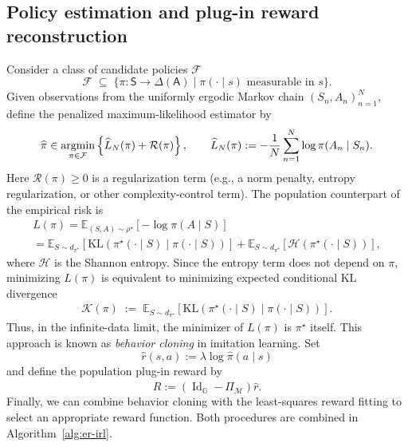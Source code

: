 \documentclass{article}
\theoremstyle{definition}
\theoremstyle{remark}
\theoremstyle{plain}
\def\argmin{\operatornamewithlimits{argmin}}
\newcommand{\E}{\mathbb{E}}
\numberwithin{equation}{section}
\begin{document}
\subsection{Policy estimation and plug-in reward reconstruction}
\label{sec:algorithm}
Consider a  class of candidate policies $\mathcal{F}$ 
\[
\mathcal{F} \;\subseteq\; 
\Big\{
\pi: \mathsf{S} \to \Delta(\mathsf{A})
\;\big|\;
\pi(\cdot\mid s) \text{ measurable in } s
\Big\}.
\]
Given observations from the uniformly ergodic Markov chain
\((S_n,A_n)_{n=1}^N\), define the penalized maximum-likelihood estimator by
\begin{equation}
\label{hat pi def}
    \widehat\pi
    \in
    \argmin_{\pi\in\mathcal F}
    \left\{
        \widehat L_N(\pi)+\mathcal R(\pi)
    \right\},
    \qquad
    \widehat L_N(\pi)
    :=
    -\frac1N\sum_{n=1}^N\log\pi(A_n\mid S_n).
\end{equation}
Here $\mathcal R(\pi)\geq 0$ is a regularization term (e.g., a norm penalty, entropy regularization, or other complexity-control term).
The population counterpart of the empirical risk is
\begin{multline}
\label{eq: L def}
L(\pi)
= \E_{(S,A)\sim \rho^\star}[-\log \pi(A\mid S)]
\\
= \E_{S \sim d_{\pi^\star}}\!\left[
\mathrm{KL}(\pi^\star(\cdot\mid S)\mid \pi(\cdot\mid S))
\right]
+ \E_{S \sim d_{\pi^\star}}\!\left[
\mathcal{H}(\pi^\star(\cdot\mid S))
\right],  
\end{multline}
where $\mathcal{H}$ is the Shannon entropy.
Since the entropy term does not depend on $\pi$, minimizing $L(\pi)$ is equivalent to minimizing expected conditional KL divergence
\begin{align}
\label{eq:kl_pi}
\mathcal{K}(\pi) \; := \;\E_{S \sim d_{\pi^\star}}\!\left[
\mathrm{KL}(\pi^\star(\cdot\mid S) \mid \pi(\cdot\mid S))
\right].
\end{align}
Thus, in the infinite-data limit, the minimizer of $L(\pi)$ is $\pi^\star$ itself.
This approach is known as \emph{behavior cloning} in imitation learning.
Set
\begin{equation}
\label{eq:rhat-def}
    \widehat r(s,a):=\lambda\log\widehat\pi(a\mid s)
\end{equation}
and define the population plug-in reward by
\begin{equation}
\label{eq:Rhat-known-P}
    \widehat R
    :=
    (\operatorname{Id}_{\mathbb G}-\Pi_{\mathcal M})\widehat r.
\end{equation}
Finally, we can combine behavior cloning with the least-squares reward fitting to select an appropriate reward function. Both procedures are combined in Algorithm~\ref{alg:er-irl}.
\end{document}
